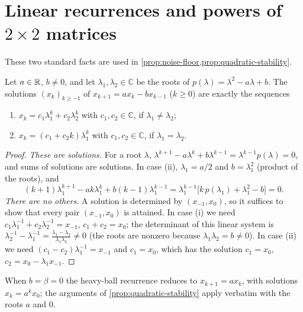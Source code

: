 \section{Linear recurrences and powers of \texorpdfstring{$2\times2$}{2x2} matrices}\label{app:linear}

These two standard facts are used in \cref{prop:noise-floor,prop:quadratic-stability}.

\begin{lemma}\label{lem:recurrence}
Let $a\in\mathbb{R}$, $b\ne0$, and let $\lambda_1,\lambda_2\in\mathbb C$ be the roots of
$p(\lambda)=\lambda^2-a\lambda+b$. The solutions $(x_k)_{k\ge-1}$ of
$x_{k+1}=ax_k-bx_{k-1}$ ($k\ge0$) are exactly the sequences
\begin{enumerate}[label=\textup{(\roman*)}]
\item $x_k=c_1\lambda_1^k+c_2\lambda_2^k$ with $c_1,c_2\in\mathbb C$, if $\lambda_1\ne\lambda_2$;
\item $x_k=(c_1+c_2k)\lambda_1^k$ with $c_1,c_2\in\mathbb C$, if $\lambda_1=\lambda_2$.
\end{enumerate}
\end{lemma}

\begin{proof}
\emph{These are solutions.} For a root $\lambda$,
$\lambda^{k+1}-a\lambda^k+b\lambda^{k-1}=\lambda^{k-1}p(\lambda)=0$, and sums of solutions
are solutions. In case (ii), $\lambda_1=a/2$ and $b=\lambda_1^2$ (product of the roots), and
\[
  (k+1)\lambda_1^{k+1}-ak\lambda_1^k+b(k-1)\lambda_1^{k-1}
  =\lambda_1^{k-1}\bigl[k\,p(\lambda_1)+\lambda_1^2-b\bigr]=0 .
\]
\emph{There are no others.} A solution is determined by $(x_{-1},x_0)$, so it suffices to
show that every pair $(x_{-1},x_0)$ is attained. In case (i) we need
$c_1\lambda_1^{-1}+c_2\lambda_2^{-1}=x_{-1}$, $c_1+c_2=x_0$; the determinant of this linear
system is $\lambda_2^{-1}-\lambda_1^{-1}=\frac{\lambda_1-\lambda_2}{\lambda_1\lambda_2}\ne0$
(the roots are nonzero because $\lambda_1\lambda_2=b\ne0$). In case (ii) we need
$(c_1-c_2)\lambda_1^{-1}=x_{-1}$ and $c_1=x_0$, which has the solution $c_1=x_0$,
$c_2=x_0-\lambda_1x_{-1}$.
\end{proof}

When $b=\beta=0$ the heavy-ball recurrence reduces to $x_{k+1}=ax_k$, with solutions
$x_k=a^kx_0$; the arguments of \cref{prop:quadratic-stability} apply verbatim with the roots
$a$ and $0$.

